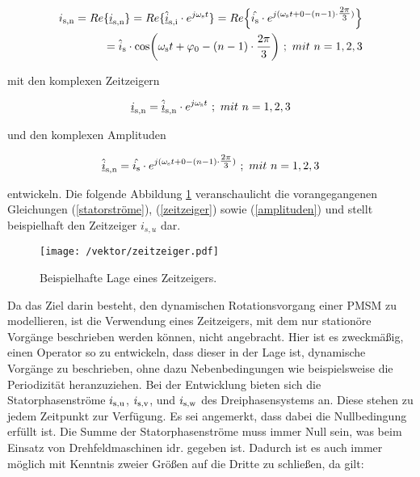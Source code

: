 \begin{align}
	\begin{split}
    i_\i{s,n} = Re\{\underline{i}_\i{s,n}\} = Re\{\underline{\hat i}_\i{s,i}\cdot e^{j\omega_\i{s}t}\} = Re\Bigl\{\hat{i_\i{s}}\cdot e^{j(\omega_\i{s}t+0-(n-1)\cdot\tfrac{2\pi}{3})}\Bigr\}
	\\=\hat{i}_\i{s}\cdot\si{cos}\bigg(\omega_\i{s}t+\varphi_\i{0}-(n-1)\cdot\frac{2\pi}{3}\bigg)~;~mit~n=1,2,3 \label{statorströme} 
\end{split}
\end{align}

\pagebreak

mit den komplexen Zeitzeigern

\begin{align}
	\underline{i}_\i{s,n} = \underline{\hat i}_\i{s,n}\cdot e^{j\omega_\i{s}t}~;~mit~n=1,2,3 \label{zeitzeiger}
\end{align}

und den komplexen Amplituden

\begin{align}
	\underline{\hat i}_\i{s,n} = \hat{i_\i{s}}\cdot e^{j(\omega_\i{s}t+0-(n-1)\cdot\tfrac{2\pi}{3})}~;~mit~n=1,2,3 \label{amplituden}
\end{align}

entwickeln. 
Die folgende Abbildung \ref{fig:zeitzeiger} veranschaulicht die vorangegangenen Gleichungen (\ref{statorströme}), (\ref{zeitzeiger}) sowie (\ref{amplituden}) und stellt beispielhaft den Zeitzeiger $i_{s,u}$ dar.

\begin{figure}[h]
	\centering
	\texttt{[image: /vektor/zeitzeiger.pdf]}
	\label{fig:zeitzeiger}
	\caption{Beispielhafte Lage eines Zeitzeigers.}
\end{figure}

Da das Ziel darin besteht, den dynamischen Rotationsvorgang einer PMSM zu modellieren, ist die Verwendung eines Zeitzeigers, mit dem nur stationöre Vorgänge beschrieben werden können, nicht angebracht. 
Hier ist es zweckmäßig, einen Operator so zu entwickeln, dass dieser in der Lage ist, dynamische Vorgänge zu beschrieben, ohne dazu Nebenbedingungen wie beispielsweise die Periodizität heranzuziehen. 
Bei der Entwicklung bieten sich die Statorphasenströme $i_\i{s,u}$, $i_\i{s,v}$, und $i_\i{s,w}$ des Dreiphasensystems an.
Diese stehen zu jedem Zeitpunkt zur Verfügung. 
Es sei angemerkt, dass dabei die Nullbedingung erfüllt ist. 
Die Summe der Statorphasenströme muss immer Null sein, was beim Einsatz von Drehfeldmaschinen idr. gegeben ist.
Dadurch ist es auch immer möglich mit Kenntnis zweier Größen auf die Dritte zu schließen, da gilt:

